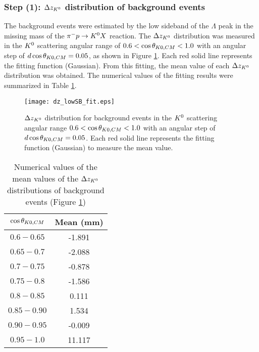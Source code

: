 \subsubsection{Step (1): $\Delta z_{K^{0}}$ distribution of background events}

The background events were estimated by the low sideband of the $\Lambda$ peak in the missing mass of the $\pi^- p \to K^0 X$ reaction. The $\Delta z_{K^{0}}$ distribution was measured in the $K^{0}$ scattering angular range of $0.6<\cos{\theta_{K0,CM}}<1.0$ with an angular step of $d\cos{\theta_{K0,CM}}=0.05$, as shown in Figure \ref{fig-dz_lowSB_fit}. Each red solid line represents the fitting function (Gaussian). From this fitting, the mean value of each $\Delta z_{K^{0}}$ distribution was obtained. The numerical values of the fitting results were summarized in Table \ref{tab-dz_lowSB_fit}. 

\begin{figure}[h]
  \centering
  \texttt{[image: dz\_lowSB\_fit.eps]}
  \caption{$\Delta z_{K^{0}}$ distribution for background events in the $K^{0}$ scattering angular range $0.6<\cos{\theta_{K0,CM}}<1.0$ with an angular step of $d\cos{\theta_{K0,CM}}=0.05$. Each red solid line represents the fitting function (Gaussian) to measure the mean value.}
  \label{fig-dz_lowSB_fit}
\end{figure}

\begin{table}[!h] 
  \begin{center}
  \caption{Numerical values of the mean values of the $\Delta z_{K^{0}}$ distributions of background events (Figure \ref{fig-dz_lowSB_fit})}
  \centering
  \begin{threeparttable}
    \begin{tabular}{cc}
    $\cos{\theta_{K0,CM}}$ & Mean (mm) \\
    \midrule\midrule
    $0.6-0.65$ & -1.891 \\
    \midrule
    $0.65-0.7$ & -2.088 \\
    \midrule
    $0.7-0.75$ & -0.878 \\
    \midrule
    $0.75-0.8$ & -1.586 \\
    \midrule
    $0.8-0.85$ & 0.111 \\
    \midrule
    $0.85-0.90$ & 1.534 \\
    \midrule
    $0.90-0.95$ & -0.009 \\
    \midrule
    $0.95-1.0$ & 11.117 \\
    \end{tabular}
  \end{threeparttable}
  \label{tab-dz_lowSB_fit}
  \end{center}
\end{table}

